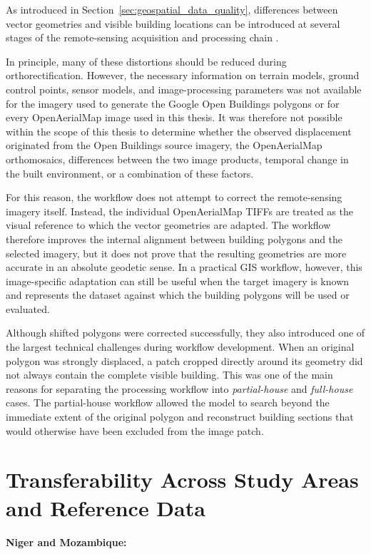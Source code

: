As introduced in Section~\ref{sec:geospatial_data_quality}, differences between vector geometries and visible building locations can be introduced at several stages of the remote-sensing acquisition and processing chain \citep{Toutin01052004}.

In principle, many of these distortions should be reduced during orthorectification. However, the necessary information on terrain models, ground control points, sensor models, and image-processing parameters was not available for the imagery used to generate the Google Open Buildings polygons or for every OpenAerialMap image used in this thesis. It was therefore not possible within the scope of this thesis to determine whether the observed displacement originated from the Open Buildings source imagery, the OpenAerialMap orthomosaics, differences between the two image products, temporal change in the built environment, or a combination of these factors.

For this reason, the workflow does not attempt to correct the remote-sensing imagery itself. Instead, the individual OpenAerialMap TIFFs are treated as the visual reference to which the vector geometries are adapted. The workflow therefore improves the internal alignment between building polygons and the selected imagery, but it does not prove that the resulting geometries are more accurate in an absolute geodetic sense. In a practical GIS workflow, however, this image-specific adaptation can still be useful when the target imagery is known and represents the dataset against which the building polygons will be used or evaluated.

Although shifted polygons were corrected successfully, they also introduced one of the largest technical challenges during workflow development. When an original polygon was strongly displaced, a patch cropped directly around its geometry did not always contain the complete visible building. This was one of the main reasons for separating the processing workflow into \textit{partial-house} and \textit{full-house} cases. The partial-house workflow allowed the model to search beyond the immediate extent of the original polygon and reconstruct building sections that would otherwise have been excluded from the image patch.

\section{Transferability Across Study Areas and Reference Data}

\textbf{Niger and Mozambique:}

